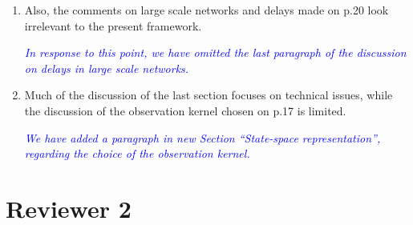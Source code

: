 \documentclass{article}
\newcommand{\parham}[1]{\textcolor{blue}{#1}}
\begin{document}
\begin{enumerate}
				\item Also, the comments on large scale networks and delays made on p.20 look irrelevant to the present framework.
				
				\emph{\parham{In response to this point, we have omitted the last paragraph of the discussion on delays in large scale networks.}}
				
				\item Much of the discussion of the last section focuses on technical issues, while the discussion of the observation kernel chosen on p.17 is limited.
				
				\emph{\parham{We have added a paragraph in new Section ``State-space representation'', regarding the choice of the observation kernel.}}

    \end{enumerate}
    
    \section{Reviewer 2}
    
\end{document}

